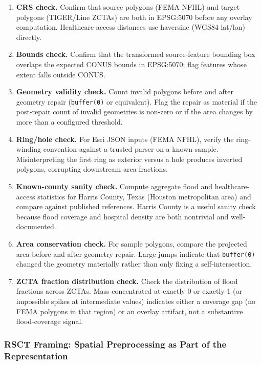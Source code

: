 \documentclass{article}
\begin{document}
\begin{enumerate}
\item \textbf{CRS check.} Confirm that source polygons (FEMA NFHL) and target polygons (TIGER/Line ZCTAs) are both in EPSG:5070 before any overlay computation. Healthcare-access distances use haversine (WGS84 lat/lon) directly.
\item \textbf{Bounds check.} Confirm that the transformed source-feature bounding box overlaps the expected CONUS bounds in EPSG:5070; flag features whose extent falls outside CONUS.
\item \textbf{Geometry validity check.} Count invalid polygons before and after geometry repair (\texttt{buffer(0)} or equivalent). Flag the repair as material if the post-repair count of invalid geometries is non-zero or if the area changes by more than a configured threshold.
\item \textbf{Ring/hole check.} For Esri JSON inputs (FEMA NFHL), verify the ring-winding convention against a trusted parser on a known sample. Misinterpreting the first ring as exterior versus a hole produces inverted polygons, corrupting downstream area fractions.
\item \textbf{Known-county sanity check.} Compute aggregate flood and healthcare-access statistics for Harris County, Texas (Houston metropolitan area) and compare against published references. Harris County is a useful sanity check because flood coverage and hospital density are both nontrivial and well-documented.
\item \textbf{Area conservation check.} For sample polygons, compare the projected area before and after geometry repair. Large jumps indicate that \texttt{buffer(0)} changed the geometry materially rather than only fixing a self-intersection.
\item \textbf{ZCTA fraction distribution check.} Check the distribution of flood fractions across ZCTAs. Mass concentrated at exactly 0 or exactly 1 (or impossible spikes at intermediate values) indicates either a coverage gap (no FEMA polygons in that region) or an overlay artifact, not a substantive flood-coverage signal.
\end{enumerate}

\subsubsection{RSCT Framing: Spatial Preprocessing as Part of the Representation}
\end{document}
